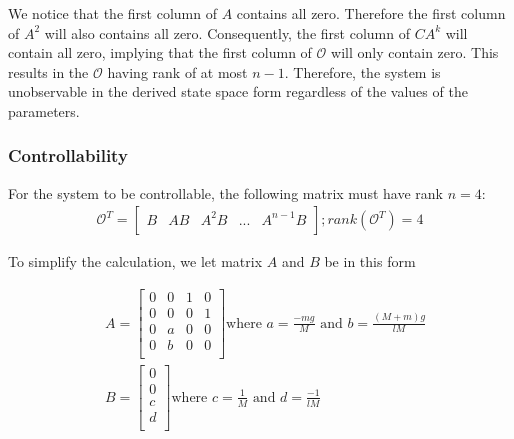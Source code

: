 \documentclass [12pt,letterpaper]{exam}
\begin{document}
We notice that the first column of $A$ contains all zero. Therefore the first column of $A^2$ will also contains all zero. Consequently, the first column of $CA^{k}$ will contain all zero, implying that the first column of $\mathcal{O}$ will only contain zero. This results in the $\mathcal{O}$ having rank of at most $n - 1$. Therefore, the system is unobservable in the derived state space form regardless of the values of the parameters.

\subsubsection{Controllability}

For the system to be controllable, the following matrix must have rank $n = 4$:
\begin{align}
\mathcal{O}^T =
\begin{bmatrix}
B & AB & A^2B & ... & A^{n-1}B \\
\end{bmatrix} ; rank(\mathcal{O}^T) = 4 
\end{align}

To simplify the calculation, we let matrix $A$ and $B$ be in this form

\begin{align}
& A = \begin{bmatrix}
0 & 0 & 1 & 0 \\
0 & 0 & 0 & 1 \\
0 & a & 0 & 0 \\
0 & b & 0 & 0 \\
\end{bmatrix} \mbox{where } a = \frac{-mg}{M} \mbox{ and } b = \frac{(M + m)g}{lM} \\
& B = \begin{bmatrix}
0 \\
0 \\
c \\
d \\
\end{bmatrix} \mbox{where } c = \frac{1}{M} \mbox{ and } d = \frac{-1}{lM}
\end{align}
\end{document}
